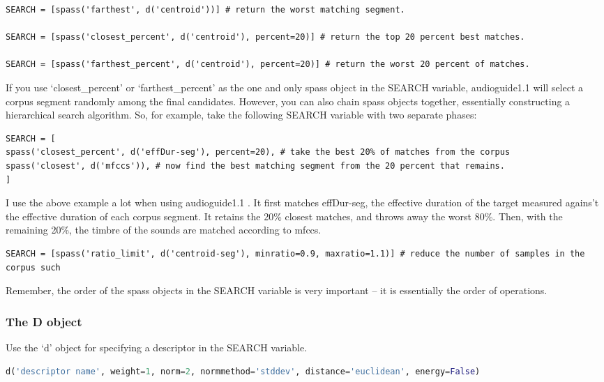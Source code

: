 \documentclass{article}
\newcommand{\ag}{audioguide1.1 }
\begin{document}
\begin{spacing}{1.2}
\begin{lstlisting}
SEARCH = [spass('farthest', d('centroid'))] # return the worst matching segment.

SEARCH = [spass('closest_percent', d('centroid'), percent=20)] # return the top 20 percent best matches.

SEARCH = [spass('farthest_percent', d('centroid'), percent=20)] # return the worst 20 percent of matches.
\end{lstlisting}

If you use `closest\_percent' or `farthest\_percent' as the one and only spass object in the SEARCH variable, \ag will select a corpus segment randomly among the final candidates.  However, you can also chain spass objects together, essentially constructing a hierarchical search algorithm.  So, for example, take the following SEARCH variable with two separate phases:

\begin{lstlisting}
SEARCH = [
spass('closest_percent', d('effDur-seg'), percent=20), # take the best 20% of matches from the corpus
spass('closest', d('mfccs')), # now find the best matching segment from the 20 percent that remains.
] 
\end{lstlisting}

I use the above example a lot when using \ag.  It first matches effDur-seg, the effective duration of the target measured agains't the effective duration of each corpus segment.  It retains the 20\% closest matches, and throws away the worst 80\%.  Then, with the remaining 20\%, the timbre of the sounds are matched according to mfccs.

\begin{lstlisting}
SEARCH = [spass('ratio_limit', d('centroid-seg'), minratio=0.9, maxratio=1.1)] # reduce the number of samples in the corpus such 
\end{lstlisting}

Remember, the order of the spass objects in the SEARCH variable is very important -- it is essentially the order of operations.

\subsubsection{The D object}
Use the `d' object for specifying a descriptor in the SEARCH variable.

 \begin{lstlisting}[language=python]
d('descriptor name', weight=1, norm=2, normmethod='stddev', distance='euclidean', energy=False)
\end{lstlisting}
 

\end{spacing}
\end{document}
